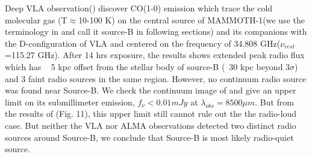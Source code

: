 \documentclass[../Results.tex]{subfiles}
\begin{document}
	Deep VLA observation(\cite{emonts2019cold}) discover CO(1-0) emission which trace the cold molecular gas (T$\approx$10-100 K) on the central source of MAMMOTH-1(we use the terminology in \cite{cai2017discovery} and call it source-B in following sections) and its companions with the D-configuration of VLA and centered on the frequency of 34.808 GHz($\nu_{rest}$=115.27 GHz). After 14 hrs exposure, the results shows extended peak radio flux which has ~ 5 kpc offset from the stellar body of source-B (~30 kpc beyond 3$\sigma$) and 3 faint radio sources in the same region. However, no continuum radio source was found near Source-B. We check the continuum image of \cite{emonts2019cold} and give an upper limit on its submillimeter emission, $f_{\nu}<0.01 mJy$ at $\lambda_{obs}=8500 \mu m$. But from the results of \cite{arrigoni2018qso}(Fig. 11), this upper limit still cannot rule out the the radio-loud case. But neither the VLA nor ALMA observations detected two distinct radio sources around Source-B, we conclude that Source-B is most likely radio-quiet source.
\end{document}
